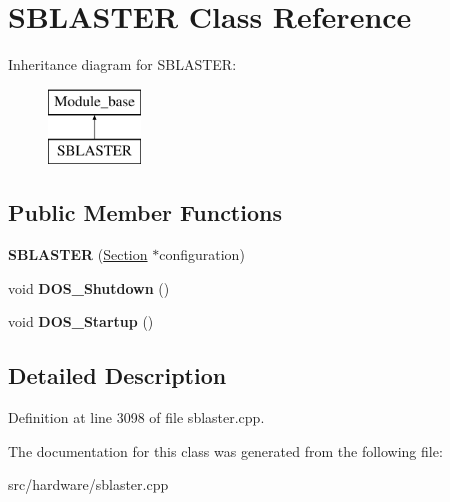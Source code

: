 \hypertarget{classSBLASTER}{\section{S\-B\-L\-A\-S\-T\-E\-R Class Reference}
\label{classSBLASTER}
}
Inheritance diagram for S\-B\-L\-A\-S\-T\-E\-R\-:\begin{figure}[H]
\begin{center}
\leavevmode
\includegraphics[height=2.000000cm]{classSBLASTER}
\end{center}
\end{figure}
\subsection*{Public Member Functions}
\begin{DoxyCompactItemize}
\item 
\hypertarget{classSBLASTER_a2e4295f253cbfbfaf7a09f6958ab884c}{{\bfseries S\-B\-L\-A\-S\-T\-E\-R} (\hyperlink{classSection}{Section} $\ast$configuration)}\label{classSBLASTER_a2e4295f253cbfbfaf7a09f6958ab884c}

\item 
\hypertarget{classSBLASTER_a5914aae53429ba3178b2e88015cffd23}{void {\bfseries D\-O\-S\-\_\-\-Shutdown} ()}\label{classSBLASTER_a5914aae53429ba3178b2e88015cffd23}

\item 
\hypertarget{classSBLASTER_a13b1b3922dde7975afc8da6b0967c569}{void {\bfseries D\-O\-S\-\_\-\-Startup} ()}\label{classSBLASTER_a13b1b3922dde7975afc8da6b0967c569}

\end{DoxyCompactItemize}


\subsection{Detailed Description}


Definition at line 3098 of file sblaster.\-cpp.



The documentation for this class was generated from the following file\-:\begin{DoxyCompactItemize}
\item 
src/hardware/sblaster.\-cpp\end{DoxyCompactItemize}
